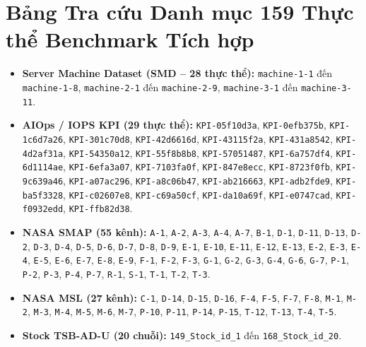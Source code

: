 \documentclass[11pt,journal,onecolumn]{IEEEtran}
\begin{document}
\section{Bảng Tra cứu Danh mục 159 Thực thể Benchmark Tích hợp}
\begin{itemize}
    \item \textbf{Server Machine Dataset (SMD -- 28 thực thể):} \texttt{machine-1-1} đến \texttt{machine-1-8}, \texttt{machine-2-1} đến \texttt{machine-2-9}, \texttt{machine-3-1} đến \texttt{machine-3-11}.
    \item \textbf{AIOps / IOPS KPI (29 thực thể):} \texttt{KPI-05f10d3a}, \texttt{KPI-0efb375b}, \texttt{KPI-1c6d7a26}, \texttt{KPI-301c70d8}, \texttt{KPI-42d6616d}, \texttt{KPI-43115f2a}, \texttt{KPI-431a8542}, \texttt{KPI-4d2af31a}, \texttt{KPI-54350a12}, \texttt{KPI-55f8b8b8}, \texttt{KPI-57051487}, \texttt{KPI-6a757df4}, \texttt{KPI-6d1114ae}, \texttt{KPI-6efa3a07}, \texttt{KPI-7103fa0f}, \texttt{KPI-847e8ecc}, \texttt{KPI-8723f0fb}, \texttt{KPI-9c639a46}, \texttt{KPI-a07ac296}, \texttt{KPI-a8c06b47}, \texttt{KPI-ab216663}, \texttt{KPI-adb2fde9}, \texttt{KPI-ba5f3328}, \texttt{KPI-c02607e8}, \texttt{KPI-c69a50cf}, \texttt{KPI-da10a69f}, \texttt{KPI-e0747cad}, \texttt{KPI-f0932edd}, \texttt{KPI-ffb82d38}.
    \item \textbf{NASA SMAP (55 kênh):} \texttt{A-1}, \texttt{A-2}, \texttt{A-3}, \texttt{A-4}, \texttt{A-7}, \texttt{B-1}, \texttt{D-1}, \texttt{D-11}, \texttt{D-13}, \texttt{D-2}, \texttt{D-3}, \texttt{D-4}, \texttt{D-5}, \texttt{D-6}, \texttt{D-7}, \texttt{D-8}, \texttt{D-9}, \texttt{E-1}, \texttt{E-10}, \texttt{E-11}, \texttt{E-12}, \texttt{E-13}, \texttt{E-2}, \texttt{E-3}, \texttt{E-4}, \texttt{E-5}, \texttt{E-6}, \texttt{E-7}, \texttt{E-8}, \texttt{E-9}, \texttt{F-1}, \texttt{F-2}, \texttt{F-3}, \texttt{G-1}, \texttt{G-2}, \texttt{G-3}, \texttt{G-4}, \texttt{G-6}, \texttt{G-7}, \texttt{P-1}, \texttt{P-2}, \texttt{P-3}, \texttt{P-4}, \texttt{P-7}, \texttt{R-1}, \texttt{S-1}, \texttt{T-1}, \texttt{T-2}, \texttt{T-3}.
    \item \textbf{NASA MSL (27 kênh):} \texttt{C-1}, \texttt{D-14}, \texttt{D-15}, \texttt{D-16}, \texttt{F-4}, \texttt{F-5}, \texttt{F-7}, \texttt{F-8}, \texttt{M-1}, \texttt{M-2}, \texttt{M-3}, \texttt{M-4}, \texttt{M-5}, \texttt{M-6}, \texttt{M-7}, \texttt{P-10}, \texttt{P-11}, \texttt{P-14}, \texttt{P-15}, \texttt{T-12}, \texttt{T-13}, \texttt{T-4}, \texttt{T-5}.
    \item \textbf{Stock TSB-AD-U (20 chuỗi):} \texttt{149\_Stock\_id\_1} đến \texttt{168\_Stock\_id\_20}.
\end{itemize}
\end{document}
